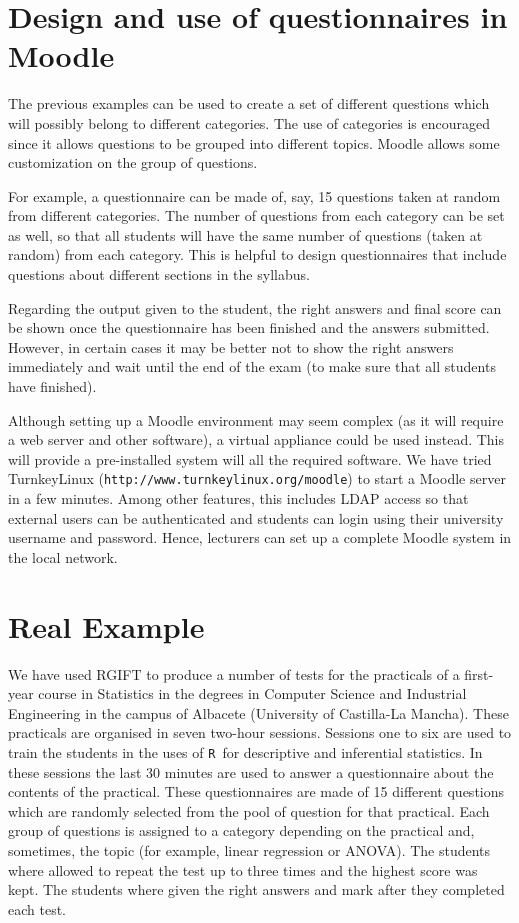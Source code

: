 \documentclass[a4paper]{article}
\newcommand{\RR}{\texttt{R}\ }
\newcommand{\pkg}[1]{\textsf{#1}}
\begin{document}
\section{Design and use of questionnaires in Moodle}

The previous examples can be used to create a set of different questions which
will possibly belong to different categories. The use of categories is
encouraged since it allows questions to be grouped into different topics.
Moodle allows some customization on the group of questions. 

For example, a questionnaire can be made of, say, 15 questions taken at random
from different categories. The number of questions from each category can be
set as well, so that all students will have the same number of questions (taken
at random) from each category.  This is helpful to design questionnaires that
include questions about different sections in the syllabus.

Regarding the output given to the student, the right answers and final score
can be shown once the questionnaire has been finished and the answers
submitted. However, in certain cases it may be better not to show the right
answers immediately and wait until the end of the exam (to make sure that all
students have finished).  

Although setting up a Moodle environment may seem complex (as it will require a
web server and other software), a virtual appliance could be used instead. This
will provide a pre-installed system will all the required software. We have
tried TurnkeyLinux (\verb+http://www.turnkeylinux.org/moodle+) to start a
Moodle server in a few minutes. Among other features, this includes LDAP
access so that external users can be authenticated and students can login
using their university username and password. Hence, lecturers can set up
a complete Moodle system in the local network.

\section{Real Example}


We have used \pkg{RGIFT} to produce a number of tests for the practicals of a
first-year course in Statistics in the degrees in Computer Science and
Industrial Engineering in the campus of Albacete (University of Castilla-La
Mancha). These practicals are organised in seven two-hour sessions. Sessions
one to six are used to train the students in the uses of \RR for descriptive
and inferential statistics. In these sessions the last 30 minutes are used to
answer a questionnaire about the contents of the practical. These
questionnaires are made of 15 different questions which are randomly selected
from the pool of question for that practical. Each group of questions is
assigned to a category depending on the practical and, sometimes, the topic
(for example, linear regression or ANOVA).
The students where allowed to repeat the test up to three times and the highest
score was kept. The students where given the right answers and mark
after they completed each test.
\end{document}
